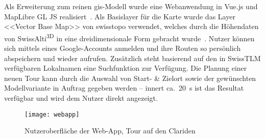 Als Erweiterung zum reinen \gls{gis}-Modell wurde eine Webanwendung in Vue.js und MapLibre GL JS realisiert~\cite{vuedevman}\cite{maplibregljs}. Als Basislayer für die Karte wurde das Layer <<Vector Base Map>> von swisstopo verwendet, welches durch die Höhendaten von SwissAlti\textsuperscript{3D} in eine dreidimensionale Form gebracht wurde~\cite{basevtprod}\cite{alti3dprod}. Nutzer können sich mittels eines Google-Accounts anmelden und ihre Routen so persönlich abspeichern und wieder aufrufen. Zusätzlich steht basierend auf den in SwissTLM verfügbaren Lokalnamen eine Suchfunktion zur Verfügung.
Die Planung einer neuen Tour kann durch die Auswahl von Start- \& Zielort sowie der gewünschten Modellvariante in Auftrag gegeben werden -- innert ca.\ \qty{20}{s} ist das Resultat verfügbar und wird dem Nutzer direkt angezeigt.


  \begin{figure}[H]
    \centering
    \texttt{[image: webapp]}
    \caption{Nutzeroberfläche der Web-App, Tour auf den Clariden}\label{fig:mainui}
  \end{figure}



